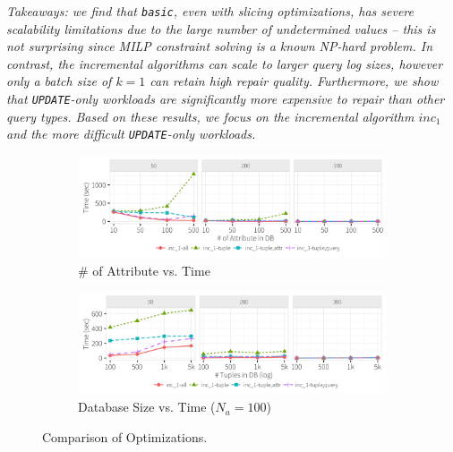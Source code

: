 {\it Takeaways: we find that \texttt{basic}, even with slicing optimizations,
has severe scalability limitations due to the large number of undetermined values -- this is not surprising
since MILP constraint solving is a known NP-hard problem.
In contrast, the incremental algorithms can scale to larger query log sizes, however only a batch size of $k=1$ can retain high repair quality.
Furthermore, we show that \texttt{UPDATE}-only workloads are significantly more expensive to repair than other query types. 
Based on these results, we focus on the incremental algorithm $inc_1$ and the more difficult \texttt{UPDATE}-only workloads.
}

 \begin{figure}[h]
    \vspace*{-.1in}
    \centering
    \begin{subfigure}[t]{.45\textwidth}
    \includegraphics[width = .99\columnwidth]{figures/attr_time}
    \vspace*{-.1in}
    \caption{\# of Attribute vs. Time}
    \label{f:attr} 
    \end{subfigure}
    \begin{subfigure}[t]{.45\textwidth}
    \includegraphics[width = .99\columnwidth]{figures/attr100_time}
    \vspace*{-.1in}
    \caption{Database Size vs. Time ($N_a = 100$)}
    \label{f:attr100} 
    \end{subfigure}
    \vspace*{-.1in}
    \caption{Comparison of Optimizations.}
  \end{figure}
  




















